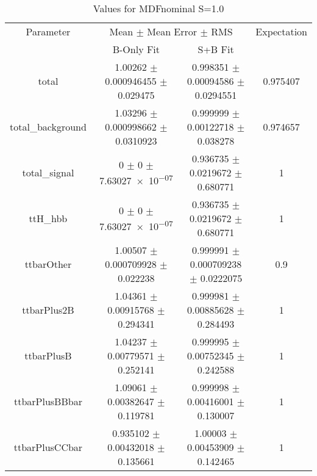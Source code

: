 \begin{table}
\centering
\caption{Values for MDFnominal S=1.0}
\begin{tabular}{cccc}
\toprule
Parameter & \multicolumn{2}{c}{Mean $\pm$ Mean Error $\pm$ RMS} & Expectation\\
 & B-Only Fit & S+B Fit & \\
\midrule
total & \num{1.00262} $\pm$ \num{0.000946455} $\pm$ \num{0.029475} & \num{0.998351} $\pm$ \num{0.00094586} $\pm$ \num{0.0294551} & \num{0.975407}\\
total\_background & \num{1.03296} $\pm$ \num{0.000998662} $\pm$ \num{0.0310923} & \num{0.999999} $\pm$ \num{0.00122718} $\pm$ \num{0.038278} & \num{0.974657}\\
total\_signal & \num{0} $\pm$ \num{0} $\pm$ \num{7.63027e-07} & \num{0.936735} $\pm$ \num{0.0219672} $\pm$ \num{0.680771} & \num{1}\\
ttH\_hbb & \num{0} $\pm$ \num{0} $\pm$ \num{7.63027e-07} & \num{0.936735} $\pm$ \num{0.0219672} $\pm$ \num{0.680771} & \num{1}\\
ttbarOther & \num{1.00507} $\pm$ \num{0.000709928} $\pm$ \num{0.022238} & \num{0.999991} $\pm$ \num{0.000709238} $\pm$ \num{0.0222075} & \num{0.9}\\
ttbarPlus2B & \num{1.04361} $\pm$ \num{0.00915768} $\pm$ \num{0.294341} & \num{0.999981} $\pm$ \num{0.00885628} $\pm$ \num{0.284493} & \num{1}\\
ttbarPlusB & \num{1.04237} $\pm$ \num{0.00779571} $\pm$ \num{0.252141} & \num{0.999995} $\pm$ \num{0.00752345} $\pm$ \num{0.242588} & \num{1}\\
ttbarPlusBBbar & \num{1.09061} $\pm$ \num{0.00382647} $\pm$ \num{0.119781} & \num{0.999998} $\pm$ \num{0.00416001} $\pm$ \num{0.130007} & \num{1}\\
ttbarPlusCCbar & \num{0.935102} $\pm$ \num{0.00432018} $\pm$ \num{0.135661} & \num{1.00003} $\pm$ \num{0.00453909} $\pm$ \num{0.142465} & \num{1}\\
\bottomrule
\end{tabular}
\end{table}
